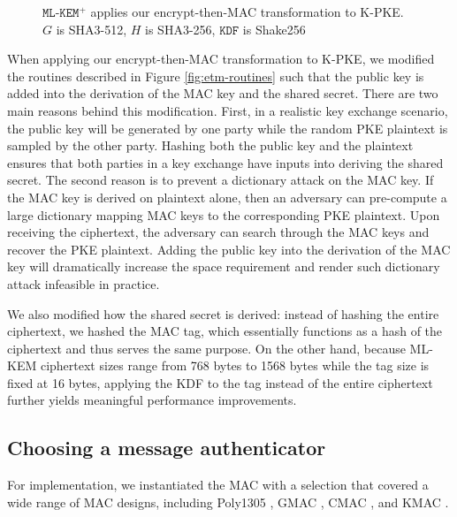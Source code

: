 \documentclass[journal=tches,submission]{iacrtrans}
\begin{document}
\begin{figure}[h]
    \caption{$\texttt{ML-KEM}^+$ applies our encrypt-then-MAC transformation to K-PKE. $G$ is SHA3-512, $H$ is SHA3-256, $\texttt{KDF}$ is Shake256}\label{fig:ml-kem-plus-routines}
\end{figure}

When applying our encrypt-then-MAC transformation to K-PKE, we modified the routines described in Figure \ref{fig:etm-routines} such that the public key is added into the derivation of the MAC key and the shared secret. There are two main reasons behind this modification. First, in a realistic key exchange scenario, the public key will be generated by one party while the random PKE plaintext is sampled by the other party. Hashing both the public key and the plaintext ensures that both parties in a key exchange have inputs into deriving the shared secret. The second reason is to prevent a dictionary attack on the MAC key. If the MAC key is derived on plaintext alone, then an adversary can pre-compute a large dictionary mapping MAC keys to the corresponding PKE plaintext. Upon receiving the ciphertext, the adversary can search through the MAC keys and recover the PKE plaintext. Adding the public key into the derivation of the MAC key will dramatically increase the space requirement and render such dictionary attack infeasible in practice.

We also modified how the shared secret is derived: instead of hashing the entire ciphertext, we hashed the MAC tag, which essentially functions as a hash of the ciphertext and thus serves the same purpose. On the other hand, because ML-KEM ciphertext sizes range from 768 bytes to 1568 bytes while the tag size is fixed at 16 bytes, applying the KDF to the tag instead of the entire ciphertext further yields meaningful performance improvements.

\subsection{Choosing a message authenticator}\label{sec:choosing-a-message-authenticator}
For implementation, we instantiated the MAC with a selection that covered a wide range of MAC designs, including Poly1305 \cite{bernstein2005poly1305}, GMAC \cite{mcgrew2004galois}, CMAC \cite{iwata2003omac}\cite{black2000cbc}, and KMAC \cite{SP80053r4}. 

\end{document}
